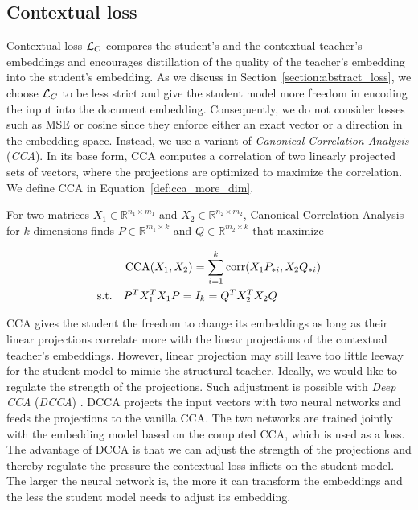 \subsection{Contextual loss}\label{section:contextual_loss}

Contextual loss $\mathcal{L}_C$ compares the student's and the contextual teacher's
embeddings and encourages distillation of the quality of the teacher's
embedding into the student's embedding. As we discuss in
Section~\ref{section:abstract_loss}, we choose $\mathcal{L}_C$ to be less strict and
give the student model more freedom in encoding the input into the
document embedding. Consequently, we do not consider losses such as MSE or
cosine since they enforce either an exact vector or a direction in the
embedding space. Instead, we use a variant of \emph{Canonical Correlation
Analysis} \citep{hotelling1992relations} (\emph{CCA}). In its base form, CCA
computes a correlation of two linearly projected sets of vectors, where the
projections are optimized to maximize the correlation. We define CCA
in Equation~\ref{def:cca_more_dim}.

\begin{defn}\label{def:cca_more_dim}

  For two matrices $X_1 \in \mathbb{R}^{n_1 \times m_1}$ and $X_2 \in
  \mathbb{R}^{n_2 \times m_2}$, Canonical Correlation Analysis for $k$
  dimensions finds $P \in \mathbb{R}^{m_1 \times k}$ and $Q \in \mathbb{R}^{m_2
  \times k}$ that maximize

  \begin{equation}
    \begin{split}
      &\operatorname*{CCA}(X_1, X_2) = \sum_{i = 1}^k \operatorname*{corr}(X_1P_{*i}, X_2Q_{*i}) \\
      \text{s.t.}\quad &P^TX_1^TX_1P = I_k = Q^TX_2^TX_2Q \\
    \end{split}
  \end{equation}


\end{defn}

CCA gives the student the freedom to change its embeddings as long as their
linear projections correlate more with the linear projections of the contextual
teacher's embeddings. However, linear projection may still leave too little
leeway for the student model to mimic the structural teacher. Ideally, we would like to regulate the strength of the projections. Such adjustment is possible with \emph{Deep CCA} (\emph{DCCA})
\citep{andrew2013deep}. DCCA projects the input vectors with two neural
networks and feeds the projections to the vanilla CCA. The two networks are
trained jointly with the embedding model based on the computed CCA, which is
used as a loss. The advantage of DCCA is that we can adjust the strength of the
projections and thereby regulate the pressure the contextual loss inflicts on
the student model. The larger the neural network is, the more it can transform
the embeddings and the less the student model needs to adjust its embedding.

